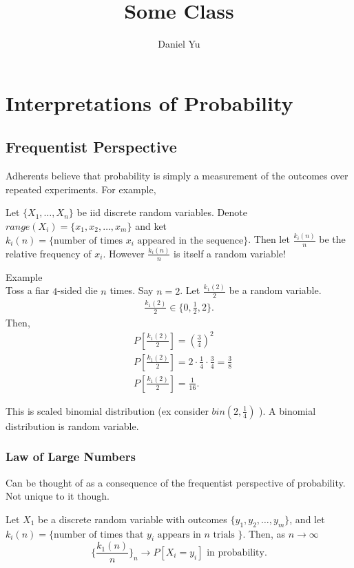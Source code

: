\documentclass[a4paper]{article}
\title{\Huge{Some Class}}
\author{\huge{Daniel Yu}}
\date{}
\begin{document}
\maketitle
\newpage%
\tableofcontents
\pagebreak
\section{Interpretations of Probability}
\subsection{Frequentist Perspective}
Adherents believe that probability is simply a measurement of the outcomes over repeated experiments. For example,

\begin{note}
  Let $\{X_1, \ldots, X_n\} $ be iid discrete random variables. Denote $range(X_i) = \{x_1,x_2,\ldots,x_m\} $ and ket $k_i(n)= \{\text{number of times $x_i$ appeared in the sequence}\}$. Then let $\frac{k_i(n)}{n}$ be the relative frequency of $x_i$. However  $\frac{k_i(n)}{n}$ is itself a random variable!
\end{note}

\begin{remark}{Example}\\
  Toss a fiar $4$-sided die  $n$ times. Say $n=2$.  Let  $\frac{k_1(2)}{2}$ be a random variable. 
  \begin{align*}
    \frac{k_1(2)}{2} \in \{0,\frac{1}{2},2\} 
  .\end{align*}
  Then,
  \begin{align*}
    & P[\frac{k_1(2)}{2}] = (\frac{3}{4})^{2} \\
    & P[\frac{k_1(2)}{2}] = 2 \cdot \frac{1}{4} \cdot \frac{3}{4} = \frac{3}{8} \\
    & P[\frac{k_1(2)}{2}] = \frac{1}{16}
  .\end{align*}

  This is scaled binomial distribution (ex consider $bin(2,\frac{1}{4})$ ). A binomial distribution is random variable. 
\end{remark}

\subsubsection{Law of Large Numbers}
Can be thought of as a consequence of the frequentist perspective of probability. Not unique to it though.
\begin{theorem}
  Let $X_1$ be a discrete random variable with outcomes  $\{y_1, y_2, \ldots, y_m\} $, and let $k_i(n) = \{\text{number of times that $y_i$ appears in $n$ trials }\} $. Then, as $n \to \infty$
  \[
    \{\frac{k_1(n)}{n}\}_{n}  \to P[X_i = y_i] \text{  in probability} 
  .\] 
\end{theorem}
\end{document}
